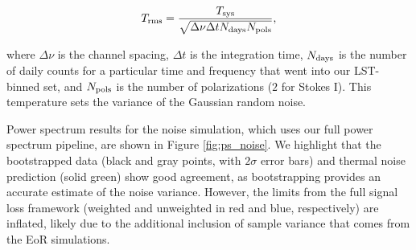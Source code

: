 \documentclass[preprint2,numberedappendix,tighten]{aastex6}  %
\begin{document}
\begin{equation}
\label{eq:noise}
T_{\rm rms} = \frac{T_{\rm sys}}{\sqrt{\Delta\nu \Delta t N_{\rm days} N_{\rm pols}}},
\end{equation}

\noindent where $\Delta\nu$ is the channel spacing, $\Delta t$ is the integration time, $N_{\rm days}$ is the number of daily counts for a 
particular time and frequency that went into our LST-binned set, and $N_{\rm pols}$ is the number of polarizations ($2$ for Stokes 
I). This temperature sets the variance of the Gaussian random noise.

Power spectrum results for the noise simulation, which uses our full power spectrum pipeline, are shown in Figure 
\ref{fig:ps_noise}. We highlight that the bootstrapped data (black and gray points, with $2\sigma$ error bars) and thermal noise prediction (solid green) show good agreement, as bootstrapping provides an accurate estimate of the noise variance. However, the limits from the full signal loss framework (weighted and unweighted in red and blue, respectively) are inflated, likely due to the additional inclusion of sample variance that comes from the EoR simulations.
\end{document}
